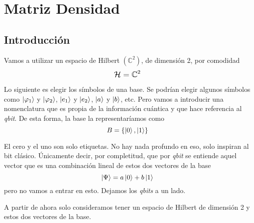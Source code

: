 %
%

\chapter{Matriz Densidad}

\section{Introducción}
Vamos a utilizar un espacio de Hilbert $\left(\mathbb{C}^2\right)$, de
dimensión 2, por comodidad
\[
  \mathlarger{\mathcal{H} = \mathbb{C}^2}
\]

Lo siguiente es elegir los símbolos de una base. Se podrían elegir algunos
símbolos como $\ket{\varphi_1}$ y $\ket{\varphi_2}$, $\ket{e_1}$ y $\ket{e_2}$,
$\ket{a}$ y $\ket{b}$, etc. Pero vamos a introducir una nomenclatura que es
propia de la información cuántica y que hace referencia al \emph{qbit}.
De esta forma, la base\footnotemark{} la representaríamos como
\[
  B = \{\ket{0}, \ket{1}\}
\]

El cero y el uno son solo etiquetas. No hay nada profundo en eso, solo inspiran
al bit clásico. Únicamente decir, por completitud, que por \emph{qbit} se
entiende aquel vector que es una combinación lineal de estos dos vectores de la
base
\[
  \ket{\Psi} = a \ket{0} + b \ket{1}
\]
pero no vamos a entrar en esto. Dejamos los \emph{qbits} a un lado.

A partir de ahora solo consideramos tener un espacio de Hilbert de dimensión 2
y estos dos vectores de la base.

